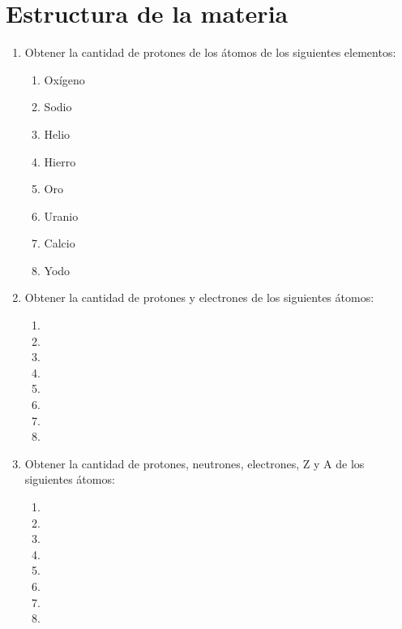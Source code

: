 \section{Estructura de la materia}

\begin{enumerate}
\item Obtener la cantidad de protones de los átomos de los siguientes elementos:
\begin{multicols}{4}
\begin{enumerate}
    \item Oxígeno
    \item Sodio
    \item Helio
    \item Hierro
    \item Oro
    \item Uranio
    \item Calcio
    \item Yodo
\end{enumerate}
\end{multicols}


\item Obtener la cantidad de protones y electrones de los siguientes átomos:
\begin{multicols}{4}
\begin{enumerate}
    \item {}
    \item {}
    \item {}
    \item {}
    \item {}
    \item {}
    \item {}
    \item {}
\end{enumerate}    
\end{multicols}


\item Obtener la cantidad de protones, neutrones, electrones, Z y A de los siguientes átomos:
\begin{multicols}{4}
\begin{enumerate}
    \item {}
    \item {}
    \item {}
    \item {}
    \item {}
    \item {}
    \item {}
    \item {}
\end{enumerate}    
\end{multicols}



\end{enumerate}
